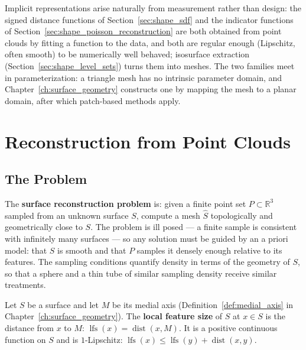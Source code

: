 Implicit representations arise naturally from measurement rather than design:
the signed distance functions of Section~\ref{sec:shape_sdf} and the indicator
functions of Section~\ref{sec:shape_poisson_reconstruction} are both obtained
from point clouds by fitting a function to the data, and both are regular
enough (Lipschitz, often smooth) to be numerically well behaved; isosurface
extraction (Section~\ref{sec:shape_level_sets}) turns them into meshes. The
two families meet in parameterization: a triangle mesh has no intrinsic
parameter domain, and Chapter~\ref{ch:surface_geometry} constructs one by
mapping the mesh to a planar domain, after which patch-based methods apply.


\section{Reconstruction from Point Clouds}
\label{sec:shape_reconstruction_point_clouds}

\subsection{The Problem}

The \textbf{surface reconstruction problem}
is: given a finite point set $P \subset \mathbb{R}^3$ sampled from an unknown
surface $S$, compute a mesh $\hat{S}$ topologically and geometrically close to
$S$. The problem is ill posed --- a finite sample is consistent with infinitely
many surfaces --- so any solution must be guided by an a priori model: that $S$
is smooth and that $P$ samples it densely enough relative to its features. The
sampling conditions quantify density in terms of the geometry of $S$, so that a
sphere and a thin tube of similar sampling density receive similar treatments.

\begin{definition}\label{def:shape_lfs}
  Let $S$ be a surface and let $M$ be its medial axis
  (Definition~\ref{def:medial_axis} in Chapter~\ref{ch:surface_geometry}). The
  \textbf{local feature size} of $S$ at $x \in S$ is the distance from $x$ to
  $M$: $\operatorname{lfs}(x) = \operatorname{dist}(x, M)$. It is a positive
  continuous function on $S$ and is $1$-Lipschitz: $\operatorname{lfs}(x) \le
  \operatorname{lfs}(y) + \operatorname{dist}(x, y)$.
\end{definition}


